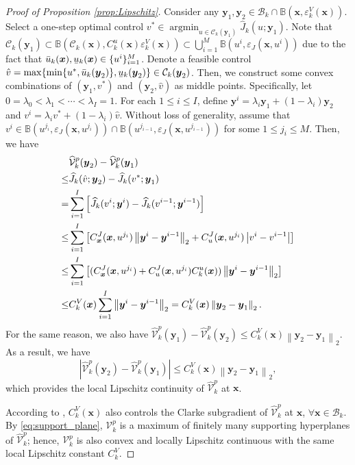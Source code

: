 \documentclass[journal]{IEEEtran}
\theoremstyle{definition}
\theoremstyle{definition}
\newcommand\norm[2][1]{\left\|#2\right\|_{#1}}
\newcommand\abs[1]{\left|#1\right|}
\renewcommand\vector[1]{\boldsymbol{#1}}
\newcommand\vx{{\vector{x}}}
\newcommand\vy{{\vector{y}}}
\DeclareMathOperator*{\argmin}{argmin}
\DeclareRobustCommand{\underbar}[1]{\kern0.3\fontdimen2\font\underaccent{\bar}{\kern-0.3\fontdimen2\font #1}}
\begin{document}
\begin{proof}[Proof of Proposition \ref{prop:Lipschitz}]
    Consider any $\vy_1,\vy_2\in\mathcal{B}_k\cap\mathbb{B}(\vx,\varepsilon_k^V(\vx))$. Select a one-step optimal control $v^*\in\argmin_{u\in\mathcal{C}_k(\vy_1)} \widehat{J}_k(u;\vy_1)$. Note that $\mathcal{C}_k(\vy_1)\subset\mathbb{B}(\mathcal{C}_k(\vx),C_k^u(\vx)\varepsilon_k^V(\vx))\subset\bigcup_{i=1}^M\mathbb{B}(u^i,\varepsilon_J(\vx,u^i))$ due to the fact that $\bar{u}_k(\vx),\underbar{u}_k(\vx)\in\{u^i\}_{i=1}^M$. Denote a feasible control $\hat{v}=\max\{\min\{u^*,\bar{u}_k(\vy_2)\},\underbar{u}_k(\vy_2)\}\in\mathcal{C}_k(\vy_2)$. Then, we construct some convex combinations of $(\vy_1,v^*)$ and $(\vy_2,\hat{v})$ as middle points. Specifically, let $0=\lambda_0<\lambda_1<\cdots<\lambda_I=1$. For each $1\leq i\leq I$, define $\vy^i=\lambda_i\vy_1+(1-\lambda_i)\vy_2$ and $v^i=\lambda_i v^*+(1-\lambda_i)\hat{v}$. Without loss of generality, assume that $v^i\in\mathbb{B}(u^{j_i},\varepsilon_J(\vx,u^{j_i}))\cap\mathbb{B}(u^{j_{i-1}},\varepsilon_J(\vx,u^{j_{i-1}}))$ for some $1\leq j_i\leq M$. Then, we have
    \begin{align}
        &\widehat{\mathcal{V}}_k^p(\vy_2)-\widehat{\mathcal{V}}_k^p(\vy_1)\notag\\
        \leq& \widehat{J}_k(\hat{v};\vy_2) - \widehat{J}_k(v^*;\vy_1)\notag\\
        =&\sum_{i=1}^{I}\left[\widehat{J}_k(v^i;\vy^i) - \widehat{J}_k(v^{i-1};\vy^{i-1})\right]\notag\\
        \leq& \sum_{i=1}^{I}\left[C_{\vx}^J(\vx,u^{j_i})\norm[2]{\vy^i-\vy^{i-1}}+C_{u}^J(\vx,u^{j_i})\abs{v^i-v^{i-1}}\right]\notag\\
        \leq& \sum_{i=1}^{I}\left[(C_{\vx}^J(\vx,u^{j_i})+C_{u}^J(\vx,u^{j_i})C_k^u(\vx))\norm[2]{\vy^i-\vy^{i-1}}\right]\notag\\
        \leq& C_k^V(\vx)\sum_{i=1}^{I}\norm[2]{\vy^i-\vy^{i-1}}
        =C_k^V(\vx)\norm[2]{\vy_2-\vy_1}.
    \end{align}
    For the same reason, we also have $\widehat{\mathcal{V}}_k^p(\vy_1)-\widehat{\mathcal{V}}_k^p(\vy_2)\leq C_k^V(\vx)\norm[2]{\vy_2-\vy_1}$. As a result, we have
    \begin{equation}\label{eq:proof_Lipschitz_V}
        \abs{\widehat{\mathcal{V}}_k^p(\vy_2)-\widehat{\mathcal{V}}_k^p(\vy_1)}\leq C_k^V(\vx)\norm[2]{\vy_2-\vy_1},
    \end{equation}
    which provides the local Lipschitz continuity of $\widehat{\mathcal{V}}_k^p$ at $\vx$.

    According to \cite{clarke1990optimization}, $C_k^V(\vx)$ also controls the Clarke subgradient of $\widehat{\mathcal{V}}_k^p$ at $\vx$, $\forall \vx\in\mathcal{B}_k$. By \eqref{eq:support_plane}, $\mathcal{V}_k^p$ is a maximum of finitely many supporting hyperplanes of $\widehat{\mathcal{V}}_k^p$; hence, $\mathcal{V}_k^p$ is also convex and locally Lipschitz continuous with the same local Lipschitz constant $C_k^V$.


\end{proof}
\end{document}
